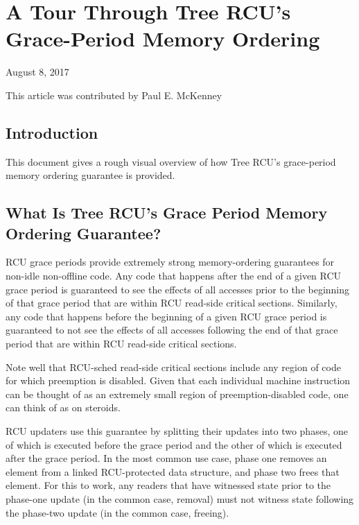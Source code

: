 \section{A Tour Through Tree RCU's Grace-Period Memory Ordering}
\label{sec:rcu:A Tour Through Tree RCU's Grace-Period Memory Ordering}

\begin{Note}
August 8, 2017

This article was contributed by Paul E. McKenney
\end{Note}

\subsection{Introduction}

This document gives a rough visual overview of how Tree RCU's
grace-period memory ordering guarantee is provided.

\subsection{What Is Tree RCU's Grace Period Memory Ordering Guarantee?}

RCU grace periods provide extremely strong memory-ordering guarantees
for non-idle non-offline code.
Any code that happens after the end of a given RCU grace period is guaranteed
to see the effects of all accesses prior to the beginning of that grace
period that are within RCU read-side critical sections.
Similarly, any code that happens before the beginning of a given RCU grace
period is guaranteed to not see the effects of all accesses following the end
of that grace period that are within RCU read-side critical sections.

Note well that RCU-sched read-side critical sections include any region
of code for which preemption is disabled.
Given that each individual machine instruction can be thought of as
an extremely small region of preemption-disabled code, one can think of
 as  on steroids.

RCU updaters use this guarantee by splitting their updates into
two phases, one of which is executed before the grace period and
the other of which is executed after the grace period.
In the most common use case, phase one removes an element from
a linked RCU-protected data structure, and phase two frees that element.
For this to work, any readers that have witnessed state prior to the
phase-one update (in the common case, removal) must not witness state
following the phase-two update (in the common case, freeing).

